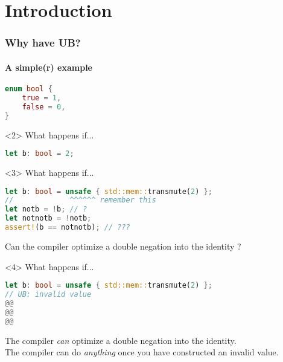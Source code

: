 \begin{frame}
    \titlepage
\end{frame}

\section{Introduction}

\begin{frame}[fragile,t]
    \frametitle{Why have UB?}
    \framesubtitle{A simple(r) example}

    \begin{lstlisting}[language=rust]
enum bool {
    true = 1,
    false = 0,
}
    \end{lstlisting}

    \begin{onlyenv}<2>
        What happens if...
        \begin{lstlisting}[language=rust]
let b: bool = 2;
        \end{lstlisting}
    \end{onlyenv}

    \begin{onlyenv}<3>
        What happens if...
        \begin{lstlisting}[language=rust]
let b: bool = unsafe { std::mem::transmute(2) };
//             ^^^^^^ remember this
let notb = !b; // ?
let notnotb = !notb;
assert!(b == notnotb); // ???
        \end{lstlisting}
        Can the compiler optimize a double negation into the identity ?
    \end{onlyenv}

    \begin{onlyenv}<4>
        What happens if...
        \begin{lstlisting}[language=rust, escapechar=@]
let b: bool = unsafe { std::mem::transmute(2) };
// UB: invalid value
@@
@@
@@
        \end{lstlisting}
        The compiler \textit{can} optimize a double negation into the identity.\\
        The compiler can do \textit{anything} once you have constructed an invalid value.
    \end{onlyenv}
\end{frame}

